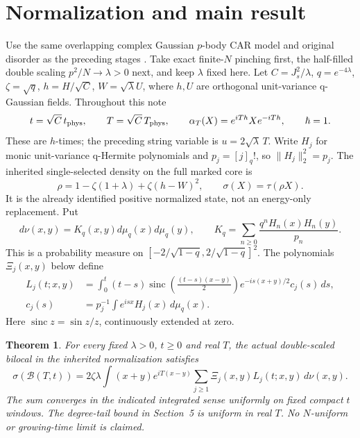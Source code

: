 \documentclass[11pt]{article}
\newcommand{\tr}{\tau}
\newcommand{\sinc}{\operatorname{sinc}}
\newtheorem{theorem}{Theorem}
\begin{document}
\section{Normalization and main result}
Use the same overlapping complex Gaussian $p$-body CAR model and
original disorder as the preceding stages \cite{sector,higher}.
Take exact finite-$N$ pinching first, the half-filled double scaling
$p^2/N\to\lambda>0$ next, and keep $\lambda$ fixed here.
Let $C=J_s^2/\lambda$, $q=e^{-4\lambda}$, $\zeta=\sqrt q$,
$h=H/\sqrt C$, $W=\sqrt\lambda U$, where $h,U$ are orthogonal
unit-variance q-Gaussian fields. Throughout this note
\[
 t=\sqrt C\,t_{\rm phys},\qquad T=\sqrt C\,T_{\rm phys},\qquad
 \alpha_T(X)=e^{iTh}Xe^{-iTh},\qquad\hbar=1.
\]
These are $h$-times; the preceding string variable is
$u=2\sqrt\lambda\,T$. Write $H_j$ for monic unit-variance
q-Hermite polynomials and $p_j=[j]_q!$, so $\|H_j\|_2^2=p_j$.
The inherited single-selected density on the full marked core is
\begin{equation}\label{rho}
 \rho=1-\zeta(1+\lambda)+\zeta(h-W)^2,
 \qquad\sigma(X)=\tr(\rho X).
\end{equation}
It is the already identified positive normalized state, not an
energy-only replacement. Put
\[
 d\nu(x,y)=K_q(x,y)d\mu_q(x)d\mu_q(y),\qquad
 K_q=\sum_{n\ge0}\frac{q^nH_n(x)H_n(y)}{p_n}.
\]
This is a probability measure on $[-2/\sqrt{1-q},2/\sqrt{1-q}]^2$.
The polynomials $\Xi_j(x,y)$ below define
\begin{align}\label{Lj}
 L_j(t;x,y)&=\int_0^t(t-s)\sinc\!\left(\frac{(t-s)(x-y)}2\right)
 e^{-is(x+y)/2}c_j(s)\,ds,\\
 c_j(s)&=p_j^{-1}\int e^{isx}H_j(x)\,d\mu_q(x).
\end{align}
Here $\sinc z=\sin z/z$, continuously extended at zero.
\begin{theorem}\label{mean}
For every fixed $\lambda>0$, $t\ge0$ and real $T$, the actual
double-scaled bilocal in the inherited normalization satisfies
\begin{equation}\label{answer}
 \boxed{\displaystyle
 \sigma(\mathcal B(T,t))=
 2\zeta\lambda\int (x+y)e^{iT(x-y)}
       \sum_{j\ge1}\Xi_j(x,y)L_j(t;x,y)\,d\nu(x,y).}
\end{equation}
The sum converges in the indicated integrated sense uniformly on
fixed compact $t$ windows. The degree-tail bound in Section~5 is
uniform in real $T$. No $N$-uniform or growing-time limit is claimed.
\end{theorem}

\newpage
\end{document}
